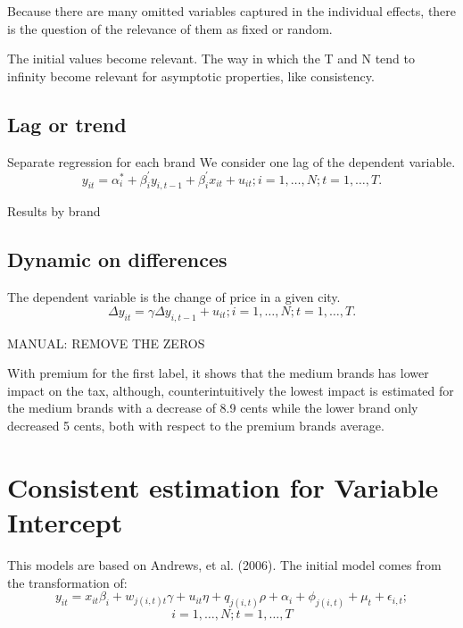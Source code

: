 \documentclass[]{article}
\begin{document}
Because there are many omitted variables captured in the individual effects, there is the question of the relevance of them as fixed or random.

The initial values become relevant.
The way in which the T and N tend to infinity become relevant for asymptotic properties, like consistency.



\subsection{Lag or trend }
Separate regression for each brand
We consider one lag of the dependent variable.
\begin{equation*}
	y_{it} = \alpha_{i}^{*} + \beta_{i}^{'}y_{i,t-1}  + \beta_{i}^{'}x_{it} + u_{it}; i = 1,\ldots,N; t=1,\ldots,T.
\end{equation*}

Results by brand

\begin{landscape}
	
\end{landscape}

\subsection{Dynamic on differences}
The dependent variable is the change of price in a given city. 
\begin{equation*}
	\Delta y_{it} = \gamma \Delta y_{i,t-1} + u_{it}; i = 1,\ldots,N; t=1,\ldots,T.
\end{equation*}



MANUAL: REMOVE THE ZEROS 

With premium for the first label, it shows that the medium brands has lower impact on the tax, although, counterintuitively the lowest impact is estimated for the medium brands with a decrease of 8.9 cents while the lower brand only decreased 5 cents, both with respect to the premium brands average. 

 
\section{Consistent estimation for Variable Intercept}
This models are based on Andrews, et al. (2006). The initial model comes from the transformation of:
\begin{equation*}
	y_{it} = x_{it} \beta_{i} + w_{j(i,t)t} \gamma + u_{it} \eta + q_{j(i,t)} \rho + \alpha_{i}  + \phi_{j(i,t)} + \mu_{t} + \epsilon_{i,t}; 
\end{equation*}
$$i = 1,\ldots,N; t=1,\ldots,T$$
\end{document}

